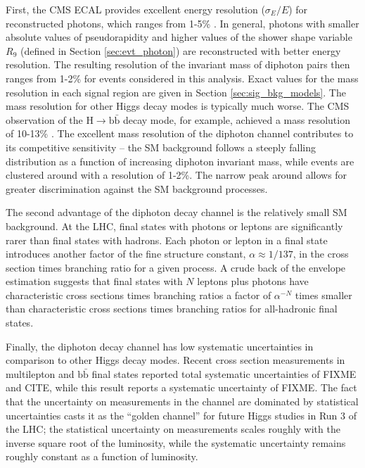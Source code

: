 First, the CMS ECAL provides excellent energy resolution ($\sigma_E/E$) for reconstructed photons, which ranges from 1-5\% \cite{Chatrchyan:2013dga}.
In general, photons with smaller absolute values of pseudorapidity and higher values of the shower shape variable $R_9$ (defined in Section \ref{sec:evt_photon}) are reconstructed with better energy resolution.
The resulting resolution of the invariant mass of diphoton pairs then ranges from 1-2\% for events considered in this analysis.
Exact values for the mass resolution in each signal region are given in Section \ref{sec:sig_bkg_models}.
The mass resolution for other Higgs decay modes is typically much worse.
The CMS observation of the $\text{H} \to \text{b}\bar{\text{b}}$ decay mode, for example, achieved a mass resolution of 10-13\% \cite{Hbb_obs}.
The excellent mass resolution of the diphoton channel contributes to its competitive sensitivity -- the SM background follows a steeply falling distribution as a function of increasing diphoton invariant mass, while \Hgg events are clustered around \mH with a resolution of 1-2\%.
The narrow peak around \mH allows for greater discrimination against the SM background processes.


The second advantage of the diphoton decay channel is the relatively small SM background.
At the LHC, final states with photons or leptons are significantly rarer than final states with hadrons.
Each photon or lepton in a final state introduces another factor of the fine structure constant, $\alpha \approx 1/137$, in the cross section times branching ratio for a given process. 
A crude back of the envelope estimation suggests that final states with $N$ leptons plus photons have characteristic cross sections times branching ratios a factor of $\alpha^{-N}$ times smaller than characteristic cross sections times branching ratios for all-hadronic final states.


Finally, the diphoton decay channel has low systematic uncertainties in comparison to other Higgs decay modes.
Recent \ttH cross section measurements in multilepton and $\text{b}\bar{\text{b}}$ final states reported total systematic uncertainties of FIXME and CITE, while this result reports a systematic uncertainty of FIXME.
The fact that the uncertainty on measurements in the \Hgg channel are dominated by statistical uncertainties casts it as the ``golden channel'' for future Higgs studies in Run 3 of the LHC; the statistical uncertainty on measurements scales roughly with the inverse square root of the luminosity, while the systematic uncertainty remains roughly constant as a function of luminosity.
